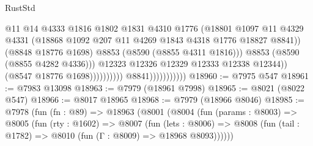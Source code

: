 \begin{lexlean}{RustStd}
\begin{coremodule}
                                                    @11
                                                    @14
                                                    @4333
                                                    @1816
                                                    @1802
                                                    @1831
                                                    @4310
                                                    @1776
                                                    (@18801
                                                      @1097
                                                      @11
                                                      @4329
                                                      @4331
                                                      (@18868
                                                        @1092
                                                        @207
                                                        @11
                                                        @4269
                                                        @1843
                                                        @4318
                                                        @1776
                                                        @18827
                                                        @8841))
                                                    (@8848 @18776 @1698)
                                                    @8853
                                                    (@8590 (@8855 @4311 @1816)))
                                                  @8853
                                                  (@8590 (@8855 @4282 @4336)))
                                                @12323
                                                @12326
                                                @12329
                                                @12333
                                                @12338
                                                @12344))
                                            (@8547 @18776 @1698))))))))))
                          @8841)))))))))))
@18960 := @7975 @547
@18961 := @7983 @13098
@18963 := @7979 (@18961 @7998)
@18965 := @8021 (@8022 @547)
@18966 := @8017 @18965
@18968 := @7979 (@18966 @8046)
@18985 := @7978
    (fun (fn : @89) =>
    @18963
      (@8001
        (@8004
          (fun (params : @8003) =>
          @8005
            (fun (rty : @1602) =>
            @8007
              (fun (lets : @8006) =>
              @8008 (fun (tail : @1782) => @8010 (fun (Γ : @8009) => @18968 @8093))))))

\end{coremodule}
\end{lexlean}
